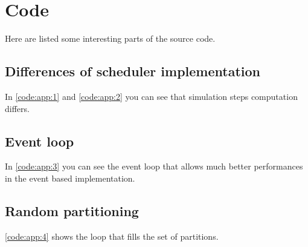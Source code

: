 \newpage\cleardoublepage{}
\section{Code}

Here are listed some interesting parts of the source code.


\subsection{Differences of scheduler implementation}

In \ref{code:app:1} and \ref{code:app:2} you can see that simulation steps computation differs.



\subsection{Event loop}

In \ref{code:app:3} you can see the event loop that allows much better performances in the event based implementation.


\subsection{Random partitioning}

\ref{code:app:4} shows the loop that fills the set of partitions.

